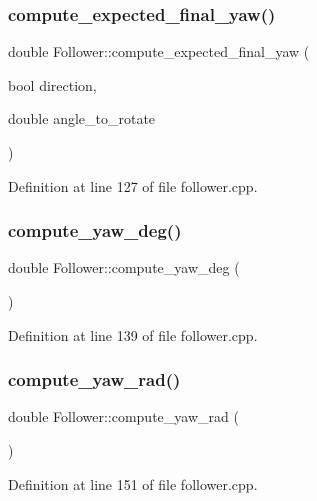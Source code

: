 \subsubsection{\texorpdfstring{compute\+\_\+expected\+\_\+final\+\_\+yaw()}{compute\_expected\_final\_yaw()}}
{\footnotesize\ttfamily double Follower\+::compute\+\_\+expected\+\_\+final\+\_\+yaw (\begin{DoxyParamCaption}\item[{bool}]{direction,  }\item[{double}]{angle\+\_\+to\+\_\+rotate }\end{DoxyParamCaption})}



Definition at line 127 of file follower.\+cpp.

\mbox{\label{class_follower_ac988cad87474cb64ef3be7fe197d90a7}} 
\subsubsection{\texorpdfstring{compute\+\_\+yaw\+\_\+deg()}{compute\_yaw\_deg()}}
{\footnotesize\ttfamily double Follower\+::compute\+\_\+yaw\+\_\+deg (\begin{DoxyParamCaption}{ }\end{DoxyParamCaption})}



Definition at line 139 of file follower.\+cpp.

\mbox{\label{class_follower_abde593631e6549062d77fb2169a17c66}} 
\subsubsection{\texorpdfstring{compute\+\_\+yaw\+\_\+rad()}{compute\_yaw\_rad()}}
{\footnotesize\ttfamily double Follower\+::compute\+\_\+yaw\+\_\+rad (\begin{DoxyParamCaption}{ }\end{DoxyParamCaption})}



Definition at line 151 of file follower.\+cpp.

